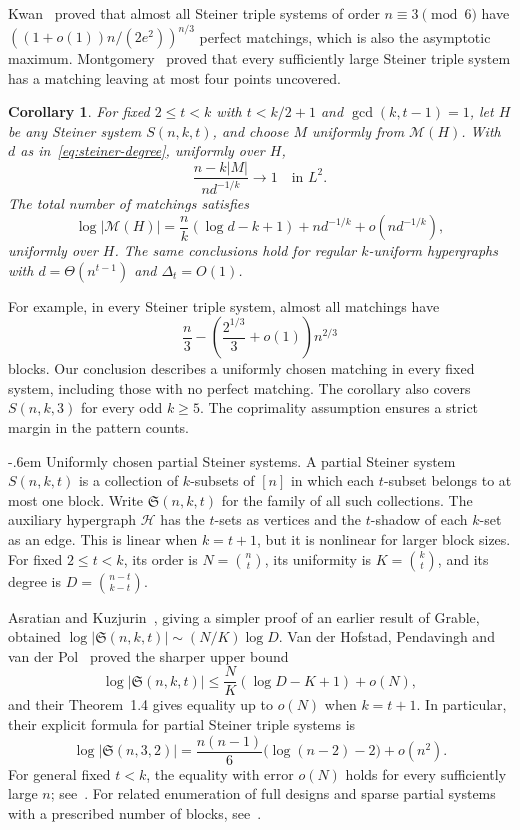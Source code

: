 \documentclass[11pt,reqno]{amsart}
\makeatletter
\numberwithin{equation}{section}
\renewcommand{\paragraph}{\@startsection{paragraph}{4}%
    \z@{.75\linespacing\@plus.2\linespacing\@minus.1\linespacing}%
    {-.6em}%
    {\normalfont\bfseries}}
\theoremstyle{plain}
\newtheorem{corollary}[theorem]{Corollary}
\theoremstyle{definition}
\newcommand{\calH}{\mathcal{H}}
\newcommand{\calM}{\mathcal{M}}
\makeatother
\begin{document}
Kwan~\cite[Theorems~1.1 and~1.2]{Kwan} proved that almost all Steiner triple systems of order $n\equiv3\pmod6$ have $((1+o(1))n/(2e^2))^{n/3}$ perfect matchings, which is also the asymptotic maximum.
Montgomery~\cite{Montgomery} proved that every sufficiently large Steiner triple system has a matching leaving at most four points uncovered.

\begin{corollary}\label{cor:steiner}
    For fixed $2\le t<k$ with $t<k/2+1$ and $\gcd(k,t-1)=1$, let $H$ be any Steiner system $S(n,k,t)$, and choose $M$ uniformly from $\calM(H)$.
    With $d$ as in~\eqref{eq:steiner-degree}, uniformly over $H$,
    \[
        \frac{n-k|M|}{nd^{-1/k}}\longrightarrow1\quad\text{in }L^2.
    \]
    The total number of matchings satisfies
    \[
        \log|\calM(H)|=\frac nk(\log d-k+1)+nd^{-1/k}+o(nd^{-1/k}),
    \]
    uniformly over $H$.
    The same conclusions hold for regular $k$-uniform hypergraphs with $d=\Theta(n^{t-1})$ and $\Delta_t=O(1)$.
\end{corollary}

For example, in every Steiner triple system, almost all matchings have
\[
    \frac n3-\left(\frac{2^{1/3}}3+o(1)\right)n^{2/3}
\]
blocks.
Our conclusion describes a uniformly chosen matching in every fixed system, including those with no perfect matching.
The corollary also covers $S(n,k,3)$ for every odd $k\ge5$.
The coprimality assumption ensures a strict margin in the pattern counts.

\paragraph{Uniformly chosen partial Steiner systems.}\label{subsec:partialsteiner}
A partial Steiner system $S(n,k,t)$ is a collection of $k$-subsets of $[n]$ in which each $t$-subset belongs to at most one block.
Write $\mathfrak S(n,k,t)$ for the family of all such collections.
The auxiliary hypergraph $\calH$ has the $t$-sets as vertices and the $t$-shadow of each $k$-set as an edge.
This is linear when $k=t+1$, but it is nonlinear for larger block sizes.
For fixed $2\le t<k$, its order is $N=\binom nt$, its uniformity is $K=\binom kt$, and its degree is $D=\binom{n-t}{k-t}$.

Asratian and Kuzjurin~\cite{AKPartial}, giving a simpler proof of an earlier result of Grable, obtained $\log|\mathfrak S(n,k,t)|\sim(N/K)\log D$.
Van der Hofstad, Pendavingh and van der Pol~\cite[Theorem~1.3]{HPP} proved the sharper upper bound
\[
    \log|\mathfrak S(n,k,t)|\le\frac NK(\log D-K+1)+o(N),
\]
and their Theorem~1.4 gives equality up to $o(N)$ when $k=t+1$.
In particular, their explicit formula for partial Steiner triple systems is
\[
    \log|\mathfrak S(n,3,2)|=\frac{n(n-1)}6\bigl(\log(n-2)-2\bigr)+o(n^2).
\]
For general fixed $t<k$, the equality with error $o(N)$ holds for every sufficiently large $n$; see~\cite[Theorem~4(b)]{BF}.
For related enumeration of full designs and sparse partial systems with a prescribed number of blocks, see~\cite{KeevashCount,McKayTian}.
\end{document}
